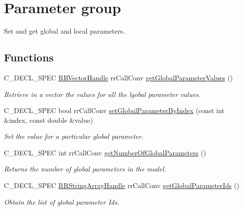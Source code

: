 \hypertarget{group__parameters}{
\section{\-Parameter group}
\label{group__parameters}
}


\-Set and get global and local parameters.  


\subsection*{\-Functions}
\begin{DoxyCompactItemize}
\item 
\-C\-\_\-\-D\-E\-C\-L\-\_\-\-S\-P\-E\-C \hyperlink{rr__c__types_8h_aea46a16752b0ae2cd95c009030ee630e}{\-R\-R\-Vector\-Handle} \*
rr\-Call\-Conv \hyperlink{group__parameters_gaf4be0a5e72db408248569a1d3e28c1f0}{get\-Global\-Parameter\-Values} ()
\begin{DoxyCompactList}\small\item\em \-Retrieve in a vector the values for all the lgobal parameter values. \end{DoxyCompactList}\item 
\-C\-\_\-\-D\-E\-C\-L\-\_\-\-S\-P\-E\-C bool rr\-Call\-Conv \hyperlink{group__parameters_ga65d9546856e5526fc403539903039f8e}{set\-Global\-Parameter\-By\-Index} (const int \&index, const double \&value)
\begin{DoxyCompactList}\small\item\em \-Set the value for a particular global parameter. \end{DoxyCompactList}\item 
\hypertarget{group__parameters_ga2f33a70dfd6c68fb585cf5d1a9c1339c}{
\-C\-\_\-\-D\-E\-C\-L\-\_\-\-S\-P\-E\-C int rr\-Call\-Conv \hyperlink{group__parameters_ga2f33a70dfd6c68fb585cf5d1a9c1339c}{get\-Number\-Of\-Global\-Parameters} ()}
\label{group__parameters_ga2f33a70dfd6c68fb585cf5d1a9c1339c}

\begin{DoxyCompactList}\small\item\em \-Returns the number of global parameters in the model. \end{DoxyCompactList}\item 
\-C\-\_\-\-D\-E\-C\-L\-\_\-\-S\-P\-E\-C \*
\hyperlink{rr__c__types_8h_a90941a6a2247bf7a8ec3d429729c5f9a}{\-R\-R\-String\-Array\-Handle} rr\-Call\-Conv \hyperlink{group__parameters_ga142050a8f4ad5c9a45455102848b5352}{get\-Global\-Parameter\-Ids} ()
\begin{DoxyCompactList}\small\item\em \-Obtain the list of global parameter \-Ids. \end{DoxyCompactList}\end{DoxyCompactItemize}



